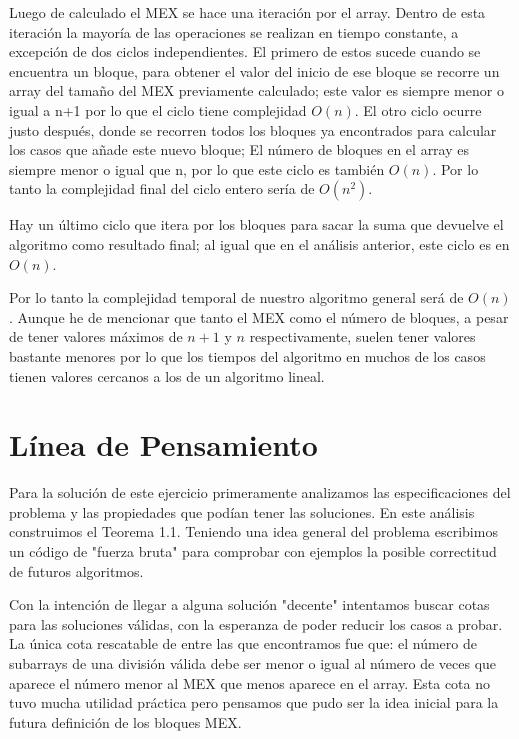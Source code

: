 \documentclass{article}
\begin{document}
Luego de calculado el MEX se hace una iteración por el array. Dentro de esta iteración la mayoría de las operaciones se realizan en tiempo constante, a excepción de dos ciclos independientes. El primero de estos sucede cuando se encuentra un bloque, para obtener el valor del inicio de ese bloque se recorre un array del tamaño del MEX previamente calculado; este valor es siempre menor o igual a n+1 por lo que el ciclo tiene complejidad $O(n)$. El otro ciclo ocurre justo después, donde se recorren todos los bloques ya encontrados para calcular los casos que añade este nuevo bloque; El número de bloques en el array es siempre menor o igual que n, por lo que este ciclo es también $O(n)$. Por lo tanto la complejidad final del ciclo entero sería de $O(n^{2})$.

Hay un último ciclo que itera por los bloques para sacar la suma que devuelve el algoritmo como resultado final; al igual que en el análisis anterior, este ciclo es en $O(n)$.

Por lo tanto la complejidad temporal de nuestro algoritmo general será de $O(n)$. Aunque he de mencionar que tanto el MEX como el número de bloques, a pesar de tener valores máximos de $n+1$ y $n$ respectivamente, suelen tener valores bastante menores por lo que los tiempos del algoritmo en muchos de los casos tienen valores cercanos a los de un algoritmo lineal.

\section*{Línea de Pensamiento}

Para la solución de este ejercicio primeramente analizamos las especificaciones del problema y las propiedades que podían tener las soluciones. En este análisis construimos el Teorema 1.1. Teniendo una idea general del problema escribimos un código de "fuerza bruta" para comprobar con ejemplos la posible correctitud de futuros algoritmos.

Con la intención de llegar a alguna solución "decente" intentamos buscar cotas para las soluciones válidas, con la esperanza de poder reducir los casos a probar. La única cota rescatable de entre las que encontramos fue que: el número de subarrays de una división válida debe ser menor o igual al número de veces que aparece el número menor al MEX que menos aparece en el array. Esta cota no tuvo mucha utilidad práctica pero pensamos que pudo ser la idea inicial para la futura definición de los bloques MEX.
\end{document}
